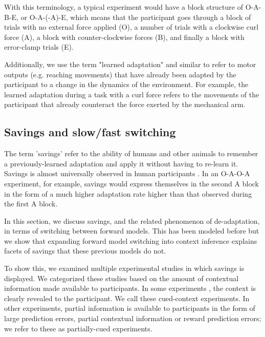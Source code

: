 \documentclass[a4paper,doc,floatsintext,natbib]{apa6}
\begin{document}
With this terminology, a typical experiment \cite[e.g.][]{Ethier_Spontaneous_2008} would have a block structure of O-A-B-E, or O-A-(-A)-E, which means that the participant goes through a block of trials with no external force applied (O), a number of trials with a clockwise curl force (A), a block with counter-clockwise forces (B), and finally a block with error-clamp trials (E).

Additionally, we use the term "learned adaptation" and similar to refer to motor outputs (e.g. reaching movements) that have already been adapted by the participant to a change in the dynamics of the environment. For example, the learned adaptation during a task with a curl force refers to the movements of the participant that already counteract the force exerted by the mechanical arm.

\subsection{Savings and slow/fast switching}
The term 'savings' refer to the ability of humans and other animals to remember a previously-learned adaptation and apply it without having to re-learn it. Savings is almost universally observed in human participants \cite{Brashers-Krug_Consolidation_1996,Shadmehr_Functional_1997,Medina_Mechanism_2001,Smith_Interacting_2006,Zarahn_Explaining_2008}. In an O-A-O-A experiment, for example, savings would express themselves in the second A block in the form of a much higher adaptation rate higher than that observed during the first A block.

In this section, we discuss savings, and the related phenomenon of de-adaptation, in terms of switching between forward models. This has been modeled before \citep[e.g.][]{Wolpert_Multiple_1998,Oh_Minimizing_2019} but we show that expanding forward model switching into context inference explains facets of savings that these previous models do not.

To show this, we examined multiple experimental studies in which savings is displayed. We categorized these studies based on the amount of contextual information made available to participants. In some experiments \citep[e.g.][]{Kim_Neural_2015,Lee_Dual_2009}, the context is clearly revealed to the participant. We call these cued-context experiments. In other experiments, partial information is available to participants \citep[e.g.][]{Davidson_Scaling_2004,Zarahn_Explaining_2008} in the form of large prediction errors, partial contextual information or reward prediction errors; we refer to these as partially-cued experiments.
\end{document}
